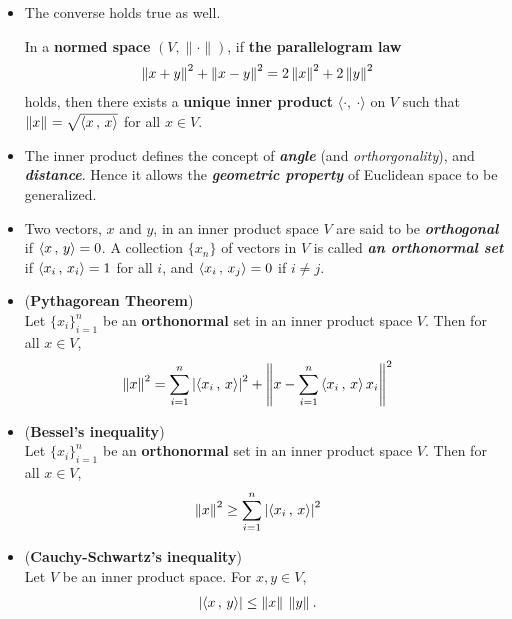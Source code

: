 \documentclass[11pt]{article}
\begin{document}
\begin{itemize}
\item The converse holds true as well.
\begin{proposition}
In a \textbf{normed space} $(V, \|\cdot \|)$, if \textbf{the parallelogram law}
\begin{align*}
\left\|x + y\right\|_{}^2 + \left\|x- y\right\|_{}^2 &= 2 \left\|x\right\|_{}^2 + 2\left\|y\right\|_{}^2
\end{align*} holds, then there exists a \textbf{unique inner product} $\langle \cdot ,\ \cdot \rangle$ on $V$ such that $\left\|x\right\|_{} = \sqrt{\left\langle x\,,\, x \right\rangle}$ for all $x \in V$.
\end{proposition}

\item \begin{remark}
The  inner product defines the concept of \emph{\textbf{angle}} (and \emph{orthorgonality}), and \emph{\textbf{distance}}. Hence it allows the \emph{\textbf{geometric property}} of Euclidean space to be generalized.
\end{remark}



\item \begin{definition}
Two vectors, $x$ and $y$, in an inner product space $V$ are said to be \emph{\textbf{orthogonal}} if $\left\langle x\,,\, y \right\rangle = 0$. A collection $\{x_n\}$ of vectors in $V$ is called \emph{\textbf{an orthonormal set}} if $\left\langle x_i\,,\, x_i \right\rangle = 1$ for all $i$, and $\left\langle x_i\,,\, x_j \right\rangle = 0$ if $i\neq j$.
\end{definition}

\item \begin{theorem} (\textbf{Pythagorean Theorem})\\
Let $\{x_i\}_{i=1}^{n}$ be an \textbf{orthonormal} set in an inner product space $V$. Then for all $x \in V$,
\begin{align*}
\left\|x\right\|_{}^2 &= \sum_{i=1}^{n}\left\lvert \left\langle x_i\,,\, x \right\rangle \right\rvert^2 + \left\|x - \sum_{i=1}^{n}\left\langle x_i\,,\, x \right\rangle x_i\right\|_{}^2
\end{align*}
\end{theorem}

\item \begin{corollary} (\textbf{Bessel's inequality})\\
Let $\{x_i\}_{i=1}^{n}$ be an \textbf{orthonormal} set in an inner product space $V$. Then for all $x \in V$,
\begin{align*}
\left\|x\right\|_{}^2 &\ge \sum_{i=1}^{n}\left\lvert \left\langle x_i\,,\, x \right\rangle \right\rvert^2 
\end{align*}
\end{corollary}

\item \begin{corollary} (\textbf{Cauchy-Schwartz's inequality})\\
Let $V$ be an inner product space. For $x,y \in V$,
\begin{align*}
\left\lvert \left\langle x\,,\, y \right\rangle \right\rvert &\le \left\|x\right\|_{}\,\left\|y\right\|_{}.
\end{align*}
\end{corollary}
\end{itemize}
\end{document}
